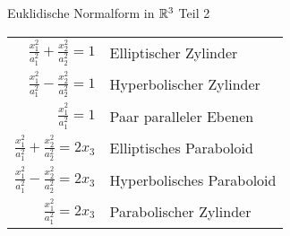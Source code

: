 \documentclass[main.tex]{subfiles}
\begin{document}
\begin{karte}{Euklidische Normalform in \( \mathbb{R}^3 \) Teil 2}
    {\renewcommand{\arraystretch}{1.5}
    \begin{center}
    \begin{tabular}{|r|l|}
        \hline
        \( \frac{x_1^2}{a_1^2} + \frac{x_2^2}{a_2^2} = 1 \) & Elliptischer Zylinder \\
        \( \frac{x_1^2}{a_1^2} - \frac{x_2^2}{a_2^2} = 1 \) & Hyperbolischer Zylinder \\
        \( \frac{x_1^2}{a_1^2} = 1 \) & Paar paralleler Ebenen \\
        \hline 
        \( \frac{x_1^2}{a_1^2} + \frac{x_2^2}{a_2^2} = 2x_3 \) & Elliptisches Paraboloid \\
        \( \frac{x_1^2}{a_1^2} - \frac{x_2^2}{a_2^2} = 2x_3 \) & Hyperbolisches Paraboloid \\
        \( \frac{x_1^2}{a_1^2} = 2x_3 \) & Parabolischer Zylinder \\
        \hline
    \end{tabular}
    \end{center}}
\end{karte}
\end{document}
